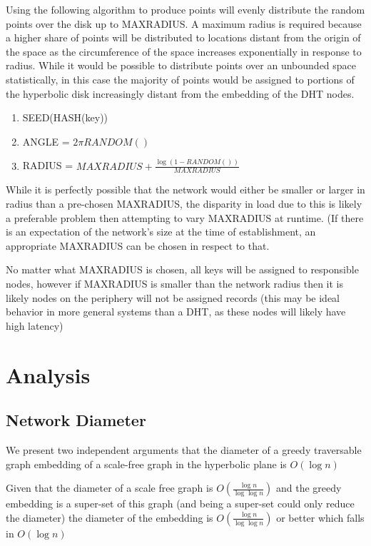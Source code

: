 Using the following algorithm to produce points will evenly distribute the random points over the disk up to MAXRADIUS. A maximum radius is required because a higher share of points will be distributed to locations distant from the origin of the space as the circumference of the space increases exponentially in response to radius. While it would be possible to distribute points over an unbounded space statistically, in this case the majority of points would be assigned to portions of the hyperbolic disk increasingly distant from the embedding of the DHT nodes.  
\begin{enumerate}
	\item SEED(HASH(key))
	\item ANGLE = $2\pi{} \dot{} \mathit{RANDOM()}$
	\item RADIUS = $\mathit{MAXRADIUS} + \frac{\log{(1-{\mathit{RANDOM()}})}}{\mathit{MAXRADIUS}}$
\end{enumerate}


While it is perfectly possible that the network would either be smaller or larger in radius than a pre-chosen MAXRADIUS, the disparity in load due to this is likely a preferable problem then attempting to vary MAXRADIUS at runtime. (If there is an expectation of the network's size at the time of establishment, an appropriate MAXRADIUS can be chosen in respect to that.

No matter what MAXRADIUS is chosen, all keys will be assigned to responsible nodes, however if MAXRADIUS is smaller than the network radius then it is likely nodes on the periphery will not be assigned records (this may be ideal behavior in more general systems than a DHT, as these nodes will likely have high latency)

\section{Analysis}

\subsection{Network Diameter}

We present two independent arguments that the diameter of a greedy traversable graph embedding of a scale-free graph in the hyperbolic plane is $O(\log{n})$

Given that the diameter of a scale free graph is $O(\frac{\log{n}}{\log{\log{n}}})$\cite{bollobas2004diameter} and the greedy embedding is a super-set of this graph (and being a super-set could only reduce the diameter) the diameter of the embedding is $O(\frac{\log{n}}{\log{\log{n}}})$ or better which falls in $O(\log{n})$

